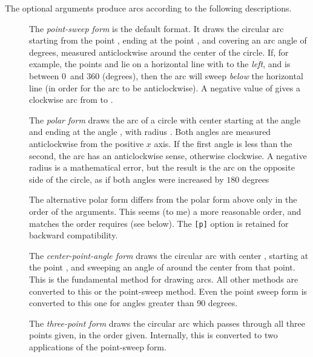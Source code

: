 \documentclass[letterpaper]{article}
\begin{document}
The optional arguments produce arcs according to the following
descriptions.
\begin{description}
\item[] The \textit{point-sweep form} is the default format. It
draws the circular arc starting from the point , ending at
the point , and covering an arc angle of \meta{$\theta$}
degrees, measured anticlockwise around the center of the circle. If,
for example, the points  and  lie on a
horizontal line with  to the \emph{left}, and \meta{$\theta$}
is between $0$~and $360$ (degrees), then the arc will sweep \emph{below} the
horizontal line (in order for the arc to be anticlockwise). A
negative value of \meta{$\theta$} gives a clockwise arc from 
to .

\item[] The \textit{polar form} draws the arc of a circle with
center  starting at the angle  and ending at
the angle , with radius . Both angles are
measured anticlockwise from the positive $x$ axis. If the first angle is
less than the second, the arc has an anticlockwise sense, otherwise
clockwise. A negative radius is a mathematical error, but the result is
the arc on the opposite side of the circle, as if both angles were
increased by $180$ degrees

\item[] The alternative polar form differs from the polar form
above only in the order of the arguments. This seems (to me) a more
reasonable order, and matches the order  requires (see below).
The \texttt{[p]} option is retained for backward compatibility.

\item[] The \textit{center-point-angle form} draws the circular
arc with center , starting at the point , and
sweeping an angle of \meta{$\theta$} around the center from that point.
This is the fundamental method for drawing arcs. All other methods are
converted to this or the point-sweep method. Even the point sweep form
is converted to this one for angles greater than 90 degrees.

\item[] The \textit{three-point form} draws the circular arc
which passes through all three points given, in the order given.
Internally, this is converted to two applications of the point-sweep
form.


\end{description}
\end{document}
